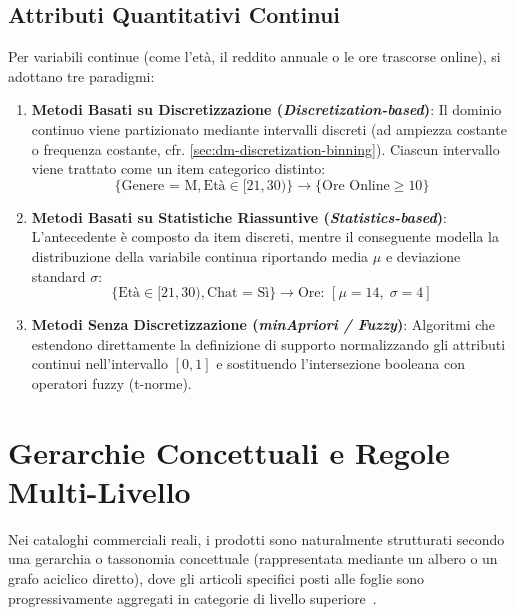 \subsection{Attributi Quantitativi Continui}
Per variabili continue (come l'età, il reddito annuale o le ore trascorse online), si adottano tre paradigmi:
\begin{enumerate}
    \item \textbf{Metodi Basati su Discretizzazione (\textit{Discretization-based})}: Il dominio continuo viene partizionato mediante intervalli discreti (ad ampiezza costante o frequenza costante, cfr. \autoref{sec:dm-discretization-binning}). Ciascun intervallo viene trattato come un item categorico distinto:
    \begin{equation}
    \{\text{Genere = M}, \text{Età} \in [21, 30)\} \longrightarrow \{\text{Ore Online} \ge 10\}
    \end{equation}
    \item \textbf{Metodi Basati su Statistiche Riassuntive (\textit{Statistics-based})}: L'antecedente è composto da item discreti, mentre il conseguente modella la distribuzione della variabile continua riportando media $\mu$ e deviazione standard $\sigma$:
    \begin{equation}
    \{\text{Età} \in [21, 30), \text{Chat = Sì}\} \longrightarrow \text{Ore: } [\mu = 14, \; \sigma = 4]
    \end{equation}
    \item \textbf{Metodi Senza Discretizzazione (\textit{minApriori / Fuzzy})}: Algoritmi che estendono direttamente la definizione di supporto normalizzando gli attributi continui nell'intervallo $[0, 1]$ e sostituendo l'intersezione booleana con operatori fuzzy (t-norme).
\end{enumerate}

\FloatBarrier
\section{Gerarchie Concettuali e Regole Multi-Livello}
\label{sec:dm-multilevel-association-rules}

Nei cataloghi commerciali reali, i prodotti sono naturalmente strutturati secondo una gerarchia o tassonomia concettuale (rappresentata mediante un albero o un grafo aciclico diretto), dove gli articoli specifici posti alle foglie sono progressivamente aggregati in categorie di livello superiore~\cite{tan2018}.

